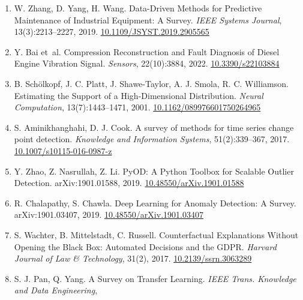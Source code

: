 \begin{enumerate}
  \label{r41}{O. Serradilla, E. Zugasti, J. Rodriguez, U.
  Zurutuza. Deep learning models for predictive maintenance: a survey,
  comparison, challenges and prospects. \emph{Applied Intelligence},
  52:10934--10964, 2022.
  \href{https://doi.org/10.1007/s10489-021-03004-y}{10.1007/s10489-021-03004-y}}
\item
  \label{r42}{W. Zhang, D. Yang, H. Wang. Data-Driven
  Methods for Predictive Maintenance of Industrial Equipment: A Survey.
  \emph{IEEE Systems Journal}, 13(3):2213--2227, 2019.
  \href{https://doi.org/10.1109/JSYST.2019.2905565}{10.1109/JSYST.2019.2905565}}
\item
  \label{r43}{Y. Bai et~al. Compression Reconstruction
  and Fault Diagnosis of Diesel Engine Vibration Signal. \emph{Sensors},
  22(10):3884, 2022.
  \href{https://doi.org/10.3390/s22103884}{10.3390/s22103884}}
\item
  \label{r44}{B. Schölkopf, J. C. Platt, J. Shawe-Taylor,
  A. J. Smola, R. C. Williamson. Estimating the Support of a
  High-Dimensional Distribution. \emph{Neural Computation},
  13(7):1443--1471, 2001.
  \href{https://doi.org/10.1162/089976601750264965}{10.1162/089976601750264965}}
\item
  \label{r45}{S. Aminikhanghahi, D. J. Cook. A survey of
  methods for time series change point detection. \emph{Knowledge and
  Information Systems}, 51(2):339--367, 2017.
  \href{https://doi.org/10.1007/s10115-016-0987-z}{10.1007/s10115-016-0987-z}}
\item
  \label{r46}{Y. Zhao, Z. Nasrullah, Z. Li. PyOD: A
  Python Toolbox for Scalable Outlier Detection. arXiv:1901.01588, 2019.
  \href{https://doi.org/10.48550/arXiv.1901.01588}{10.48550/arXiv.1901.01588}}
\item
  \label{r47}{R. Chalapathy, S. Chawla. Deep Learning for
  Anomaly Detection: A Survey. arXiv:1901.03407, 2019.
  \href{https://doi.org/10.48550/arXiv.1901.03407}{10.48550/arXiv.1901.03407}}
\item
  \label{r48}{S. Wachter, B. Mittelstadt, C. Russell.
  Counterfactual Explanations Without Opening the Black Box: Automated
  Decisions and the GDPR. \emph{Harvard Journal of Law \& Technology},
  31(2), 2017.
  \href{https://doi.org/10.2139/ssrn.3063289}{10.2139/ssrn.3063289}}
\item
  \label{r49}{S. J. Pan, Q. Yang. A Survey on Transfer
  Learning. \emph{IEEE Trans. Knowledge and Data Engineering},
}
\end{enumerate}
